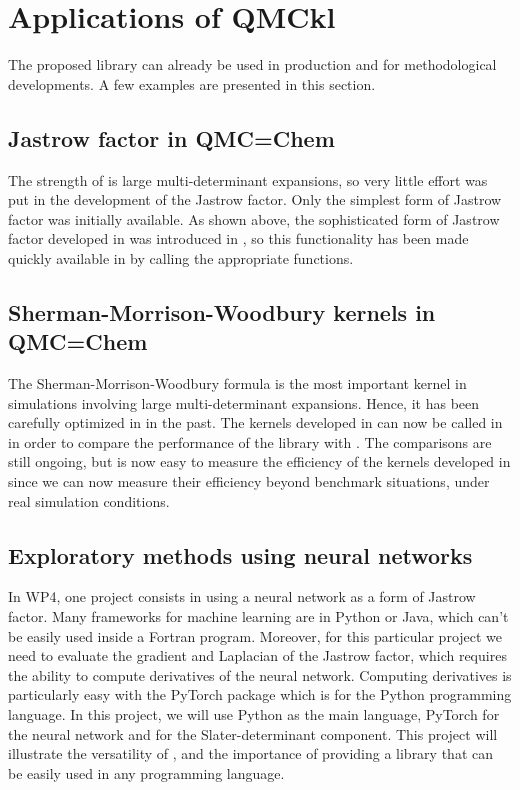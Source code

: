 \section{Applications of QMCkl}

The proposed library can already be used in production and for
methodological developments. A few examples are presented in this section.

\subsection{Jastrow factor in QMC=Chem}

The strength of \qmcchem{} is large multi-determinant expansions, so very
little effort was put in the development of the Jastrow factor. Only the
simplest form of Jastrow factor was initially available. As shown above, the
sophisticated form of Jastrow factor developed in \champ{} was introduced
in \QMCkl{}, so this functionality has been made quickly available
in \qmcchem{} by calling the \QMCkl{} appropriate functions.

\subsection{Sherman-Morrison-Woodbury kernels in QMC=Chem}

The Sherman-Morrison-Woodbury formula is the most important kernel in
simulations involving large multi-determinant expansions. Hence, it has
been carefully optimized in \qmcchem{} in the past. The kernels
developed in \QMCkl{} can now be called in \qmcchem{} in order
to compare the performance of the library with \qmcchem{}. The
comparisons are still ongoing, but is now easy to measure the
efficiency of the kernels developed in \QMCkl{} since we can now
measure their efficiency beyond benchmark situations, under real
simulation conditions.

\subsection{Exploratory methods using neural networks}

In \ac{WP}4, one project consists in using a neural network as a
form of Jastrow factor. Many frameworks for machine learning are in
Python or Java, which can't be easily used inside a Fortran program.
Moreover, for this particular project we need to evaluate the gradient
and Laplacian of the Jastrow factor, which requires the ability to
compute derivatives of the neural network. Computing derivatives is
particularly easy with the PyTorch package which is for the Python
programming language. In this project, we will use Python as the main
language, PyTorch for the neural network and \QMCkl{} for the
Slater-determinant component. This project will illustrate the
versatility of \QMCkl{}, and the importance of providing a library that
can be easily used in any programming language.


